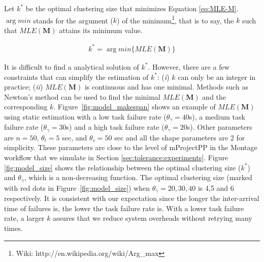 


Let $k^*$ be the optimal clustering size that minimizes Equation \ref{eq:MLE-M}.  $\arg min$  stands for the argument ($k$) of the minimum\footnote{Wiki: http://en.wikipedia.org/wiki/Arg\_max}, that is to say, the $k$ such that $MLE(\bm{M})$ attains its minimum value. 

\begin{eqnarray} 
\label{eq:k_optimal}
k^*=\arg min\{MLE(\bm{M})\} 
\end{eqnarray}

It is difficult to find a analytical solution of $k^*$. However, there are a few constraints that can simplify the estimation of $k^*$: (\emph{i}) $k$ can only be an integer in practice; (\emph{ii}) $MLE(\bm{M})$ is continuous and has one minimal. Methods such as Newton's method can be used to find the minimal $MLE(\bm{M})$ and the corresponding $k$. Figure~\ref{fig:model_makespan} shows an example of $MLE(\bm{M})$ using static estimation with a low task failure rate ($\theta_{\gamma}=40$s), a medium task failure rate ($\theta_{\gamma}=30$s) and a high task failure rate ($\theta_{\gamma}=20$s). Other parameters are $n=50$, $\theta_{t}=5$ sec, and $\theta_{s}=50$ sec and all the shape parameters are 2 for simplicity. These parameters are close to the level of mProjectPP in the Montage workflow that we simulate in Section \ref{sec:tolerance:experiments}. 
Figure \ref{fig:model_size} shows the relationship between the optimal clustering size ($k^*$) and $\theta_{\gamma}$, which is a non-decreasing function. The optimal clustering size (marked with red dots in Figure~\ref{fig:model_size}) when $\theta_{\gamma}=20,30,40$ is 4,5 and 6 respectively. 
 It is consistent with our expectation since the longer the inter-arrival time of failures is, the lower the task failure rate is. With a lower task failure rate, a larger $k$ assures that we reduce system overheads without retrying many times.  



